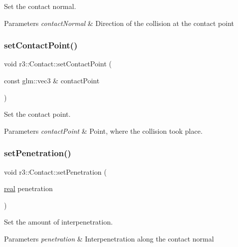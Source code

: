 Set the contact normal. 


\begin{DoxyParams}{Parameters}
{\em contact\+Normal} & Direction of the collision at the contact point \\
\hline
\end{DoxyParams}
\mbox{\label{classr3_1_1_contact_aedd044892a1adf0692b7cc9f81b4436a}} 
\subsubsection{\texorpdfstring{set\+Contact\+Point()}{setContactPoint()}}
{\footnotesize\ttfamily void r3\+::\+Contact\+::set\+Contact\+Point (\begin{DoxyParamCaption}\item[{const glm\+::vec3 \&}]{contact\+Point }\end{DoxyParamCaption})}



Set the contact point. 


\begin{DoxyParams}{Parameters}
{\em contact\+Point} & Point, where the collision took place. \\
\hline
\end{DoxyParams}
\mbox{\label{classr3_1_1_contact_a828feb22ff02fe787739eb5d87cfec38}} 
\subsubsection{\texorpdfstring{set\+Penetration()}{setPenetration()}}
{\footnotesize\ttfamily void r3\+::\+Contact\+::set\+Penetration (\begin{DoxyParamCaption}\item[{\mbox{\hyperlink{namespacer3_ab2016b3e3f743fb735afce242f0dc1eb}{real}}}]{penetration }\end{DoxyParamCaption})}



Set the amount of interpenetration. 


\begin{DoxyParams}{Parameters}
{\em penetration} & Interpenetration along the contact normal \\
\hline
\end{DoxyParams}


